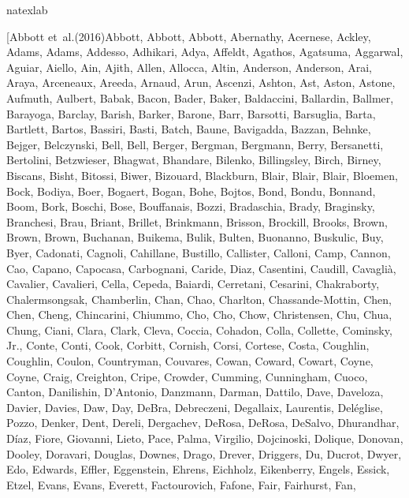 \documentclass{aa}
\begin{document}

%
\begin{thebibliography}{242}
\expandafter\ifx\csname natexlab\endcsname\relax\def\natexlab#1{#1}\fi

\bibitem[{Abbott {et~al.}(2016)Abbott, Abbott, Abbott, Abernathy, Acernese,
  Ackley, Adams, Adams, Addesso, Adhikari, Adya, Affeldt, Agathos, Agatsuma,
  Aggarwal, Aguiar, Aiello, Ain, Ajith, Allen, Allocca, Altin, Anderson,
  Anderson, Arai, Araya, Arceneaux, Areeda, Arnaud, Arun, Ascenzi, Ashton, Ast,
  Aston, Astone, Aufmuth, Aulbert, Babak, Bacon, Bader, Baker, Baldaccini,
  Ballardin, Ballmer, Barayoga, Barclay, Barish, Barker, Barone, Barr,
  Barsotti, Barsuglia, Barta, Bartlett, Bartos, Bassiri, Basti, Batch, Baune,
  Bavigadda, Bazzan, Behnke, Bejger, Belczynski, Bell, Bell, Berger, Bergman,
  Bergmann, Berry, Bersanetti, Bertolini, Betzwieser, Bhagwat, Bhandare,
  Bilenko, Billingsley, Birch, Birney, Biscans, Bisht, Bitossi, Biwer,
  Bizouard, Blackburn, Blair, Blair, Blair, Bloemen, Bock, Bodiya, Boer,
  Bogaert, Bogan, Bohe, Bojtos, Bond, Bondu, Bonnand, Boom, Bork, Boschi, Bose,
  Bouffanais, Bozzi, Bradaschia, Brady, Braginsky, Branchesi, Brau, Briant,
  Brillet, Brinkmann, Brisson, Brockill, Brooks, Brown, Brown, Brown, Buchanan,
  Buikema, Bulik, Bulten, Buonanno, Buskulic, Buy, Byer, Cadonati, Cagnoli,
  Cahillane, Bustillo, Callister, Calloni, Camp, Cannon, Cao, Capano, Capocasa,
  Carbognani, Caride, Diaz, Casentini, Caudill, Cavaglià, Cavalier, Cavalieri,
  Cella, Cepeda, Baiardi, Cerretani, Cesarini, Chakraborty, Chalermsongsak,
  Chamberlin, Chan, Chao, Charlton, Chassande-Mottin, Chen, Chen, Cheng,
  Chincarini, Chiummo, Cho, Cho, Chow, Christensen, Chu, Chua, Chung, Ciani,
  Clara, Clark, Cleva, Coccia, Cohadon, Colla, Collette, Cominsky, Jr., Conte,
  Conti, Cook, Corbitt, Cornish, Corsi, Cortese, Costa, Coughlin, Coughlin,
  Coulon, Countryman, Couvares, Cowan, Coward, Cowart, Coyne, Coyne, Craig,
  Creighton, Cripe, Crowder, Cumming, Cunningham, Cuoco, Canton, Danilishin,
  D’Antonio, Danzmann, Darman, Dattilo, Dave, Daveloza, Davier, Davies, Daw,
  Day, DeBra, Debreczeni, Degallaix, Laurentis, Deléglise, Pozzo, Denker,
  Dent, Dereli, Dergachev, DeRosa, DeRosa, DeSalvo, Dhurandhar, Díaz, Fiore,
  Giovanni, Lieto, Pace, Palma, Virgilio, Dojcinoski, Dolique, Donovan, Dooley,
  Doravari, Douglas, Downes, Drago, Drever, Driggers, Du, Ducrot, Dwyer, Edo,
  Edwards, Effler, Eggenstein, Ehrens, Eichholz, Eikenberry, Engels, Essick,
  Etzel, Evans, Evans, Everett, Factourovich, Fafone, Fair, Fairhurst, Fan,
}
\end{thebibliography}
\end{document}
